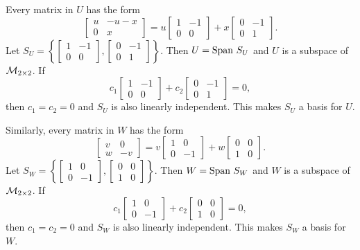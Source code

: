 \begin{example}
\ExampleSolution
 	\ba
	\item  Every matrix in $U$ has the form 
\[\left[ \begin{array}{cc} u & -u-x \\  0 &   x \end{array} \right] = u\left[ \begin{array}{cr} 1 & -1 \\  0 & 0 \end{array} \right] + x\left[ \begin{array}{cr} 0 & -1 \\  0 & 1 \end{array} \right].\]
Let $S_U = \left\{ \left[ \begin{array}{cr} 1 & -1 \\  0 & 0 \end{array} \right], \left[ \begin{array}{cr} 0 & -1 \\  0 & 1 \end{array} \right] \right\}$. Then $U = \text{Span} \ S_U$ and $U$ is a subspace of $\mathcal{M}_{2 \times 2}$. If 
\[c_1\left[ \begin{array}{cr} 1 & -1 \\  0 & 0 \end{array} \right] + c_2\left[ \begin{array}{cr} 0 & -1 \\  0 & 1 \end{array} \right] = 0,\]
then $c_1=c_2=0$ and $S_U$ is also linearly independent. This makes $S_U$ a basis for $U$. 

Similarly, every matrix in $W$ has the form 
\[\left[ \begin{array}{cc}   v &  0 \\ w & -v \end{array} \right] = v \left[ \begin{array}{cr} 1 & 0 \\  0 & -1 \end{array} \right] + w\left[ \begin{array}{cc} 0 & 0 \\  1 & 0 \end{array} \right].\]
Let $S_W = \left\{ \left[ \begin{array}{cr} 1 & 0 \\  0 & -1 \end{array} \right] , \left[ \begin{array}{cc} 0 & 0 \\  1 & 0 \end{array} \right] \right\}$. Then $W = \text{Span} \ S_W$ and $W$ is a subspace of $\mathcal{M}_{2 \times 2}$. If 
\[c_1\left[ \begin{array}{cr} 1 & 0 \\  0 & -1 \end{array} \right] + c_2\left[ \begin{array}{cc} 0 & 0 \\  1 & 0 \end{array} \right]  = 0,\]
then $c_1=c_2=0$ and $S_W$ is also linearly independent. This makes $S_W$ a basis for $W$. 
	

\end{example}
